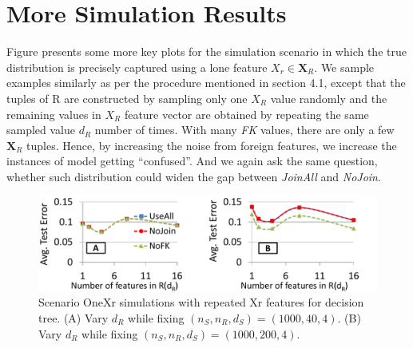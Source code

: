 \documentclass{vldb}
\begin{document}
\section{More Simulation Results}
Figure presents some more key plots for the simulation scenario in which the true distribution is precisely captured using a lone feature $X_r \in \textbf{X}_R$. We sample examples similarly as per the procedure mentioned in section 4.1, except that the tuples of R are constructed by sampling only one $X_R$ value randomly and the remaining values in $X_R$ feature vector are obtained by repeating the same sampled value $d_R$ number of times.  With many \textit{FK} values, there are only a few $\textbf{X}_R$ tuples. Hence, by increasing the noise from foreign features, we increase the instances of model getting ``confused''. And we again ask the same question, whether such distribution could widen the gap between \textit{JoinAll} and \textit{NoJoin}. 
\begin{figure}[h]
\centering
\includegraphics[width=0.99\linewidth]{onexr_jerrydt.pdf}
\caption{Scenario OneXr simulations with repeated Xr features for decision tree. (A) Vary $d_R$ while fixing $(n_S, n_R, d_S) = (1000, 40, 4)$. (B) Vary $d_R$ while fixing $(n_S, n_R, d_S) = (1000, 200, 4)$.}
\label{Figure:OneXrjerry_dt}
\end{figure}
\end{document}

